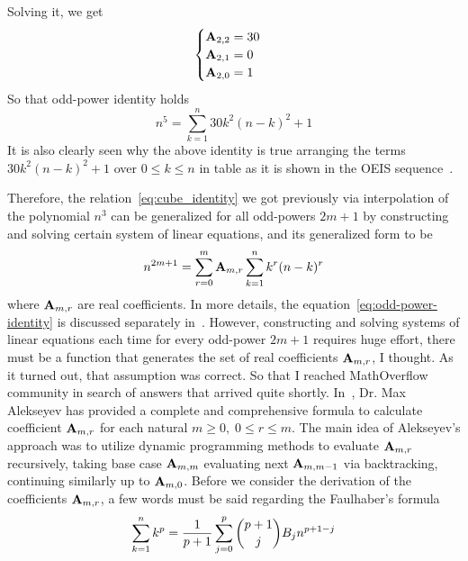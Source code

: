 Solving it, we get
\begin{equation*}
    \begin{cases}
        {\mathbf{A}} \sb{2,2} = 30 \\
        {\mathbf{A}} \sb{2,1} = 0 \\
        {\mathbf{A}} \sb{2,0} = 1
    \end{cases}
\end{equation*}
So that odd-power identity holds
\begin{equation*}
    n^5 = \sum_{k=1}^{n} 30k^2(n-k)^2 + 1
\end{equation*}
It is also clearly seen
why the above identity is true arranging the terms $30k^2(n-k)^2 + 1$ over $0 \leq k \leq n$ in table as
it is shown in the OEIS sequence~\cite{kolosov2018fifth}.

Therefore, the relation~\eqref{eq:cube_identity} we got previously via interpolation of the polynomial $n^3$
can be generalized for all odd-powers $2m+1$ by constructing and solving certain system of linear equations,
and its generalized form to be
\begin{equation}
    n^{2m+1} = \sum_{r=0}^{m} {\mathbf{A}} \sb{m,r} \sum_{k=1}^{n} k^{r} (n-k)^{r}\label{eq:odd-power-identity}
\end{equation}
where ${\mathbf{A}} \sb{m,r}$ are real coefficients.
In more details, the equation~\eqref{eq:odd-power-identity} is discussed
separately in~\cite{kolosov2022106, kolosov2023polynomial}.
However, constructing and solving systems of linear equations each time for every odd-power $2m+1$ requires huge effort,
there must be a function that generates the set of real coefficients ${\mathbf{A}} \sb{m,r}$, I thought.
As it turned out, that assumption was correct.
So that I reached MathOverflow community in search of answers that arrived quite shortly.
In~\cite{alekseyev2018mathoverflow}, Dr. Max Alekseyev has provided a complete and comprehensive formula to calculate
coefficient ${\mathbf{A}} \sb{m,r}$ for each natural $m\geq 0, \; 0 \leq r \leq m$.
The main idea of Alekseyev's approach was to utilize dynamic programming methods to evaluate ${\mathbf{A}} \sb{m,r}$ recursively,
taking base case ${\mathbf{A}} \sb{m,m}$ evaluating next ${\mathbf{A}} \sb{m,m-1}$ via backtracking,
continuing similarly up to ${\mathbf{A}} \sb{m,0}$.
Before we consider the derivation of the coefficients ${\mathbf{A}} \sb{m,r}$,
a few words must be said regarding the Faulhaber's formula
\begin{equation*}
    \sum_{k=1}^{n} k^{p} = \frac{1}{p+1}\sum_{j=0}^{p} \binom{p+1}{j} {B}\sb{j} n^{p+1-j}
\end{equation*}
